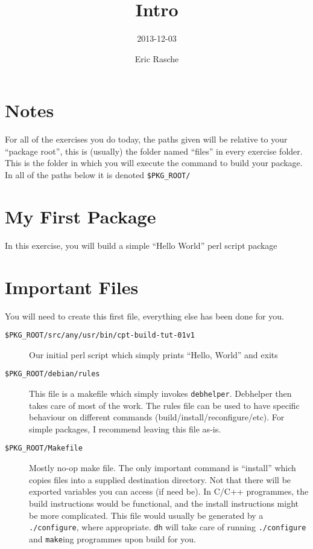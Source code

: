 \documentclass[]{article}
\title{Intro}
\author{2013-12-03}
\date{Eric Rasche}
\begin{document}
\maketitle

\section{Notes}

For all of the exercises you do today, the paths given will be relative
to your ``package root'', this is (usually) the folder named ``files''
in every exercise folder. This is the folder in which you will execute
the command to build your package. In all of the paths below it is
denoted \texttt{\$PKG\_ROOT/}

\section{My First Package}

In this exercise, you will build a simple ``Hello World'' perl script
package

\section{Important Files}

You will need to create this first file, everything else has been done
for you.

\begin{description}
\item[\texttt{\$PKG\_ROOT/src/any/usr/bin/cpt-build-tut-01v1}]
Our initial perl script which simply prints ``Hello, World'' and exits

\item[\texttt{\$PKG\_ROOT/debian/rules}]
This file is a makefile which simply invokes \texttt{debhelper}.
Debhelper then takes care of most of the work. The rules file can be
used to have specific behaviour on different commands
(build/install/reconfigure/etc). For simple packages, I recommend
leaving this file as-is.

\item[\texttt{\$PKG\_ROOT/Makefile}]
Mostly no-op make file. The only important command is ``install'' which
copies files into a supplied destination directory. Not that there will
be exported variables you can access (if need be). In C/C++ programmes,
the build instructions would be functional, and the install instructions
might be more complicated. This file would usually be generated by a
\texttt{./configure}, where appropriate. \texttt{dh} will take care of
running \texttt{./configure} and \texttt{make}ing programmes upon build
for you.

\end{description}
\end{document}
